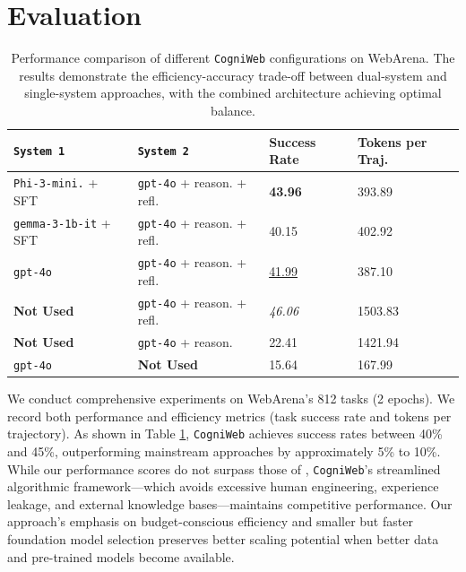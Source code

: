 \documentclass{article}
\begin{document}
\section{Evaluation}
    \begin{table}
    \centering
    \caption{Performance comparison of different \texttt{CogniWeb} configurations on WebArena. The results demonstrate the efficiency-accuracy trade-off between dual-system and single-system approaches, with the combined architecture achieving optimal balance.}\label{results}
    \begin{tabular}{p{}|p{}|p{}p{}}
        \toprule
        \midrule
        \texttt{System 1} & \texttt{System 2} & \textbf{Success Rate} & \textbf{Tokens per Traj.} \\
        \midrule
        \texttt{Phi-3-mini.} + SFT & \texttt{gpt-4o} + reason. + refl. & \textbf{43.96} & 393.89 \\
        \midrule
        \texttt{gemma-3-1b-it} + SFT & \texttt{gpt-4o} + reason. + refl. & 40.15 & 402.92 \\
        \midrule
        \texttt{gpt-4o} & \texttt{gpt-4o} + reason. + refl. & \underline{41.99} & 387.10 \\
        \midrule\midrule
        \textbf{Not Used} & \texttt{gpt-4o} + reason. + refl. & \textit{46.06} & 1503.83 \\
        \midrule
        \textbf{Not Used} & \texttt{gpt-4o} + reason. & 22.41 & 1421.94 \\
        \midrule
        \texttt{gpt-4o} & \textbf{Not Used} & 15.64 & 167.99 \\
        \midrule
        \bottomrule
    \end{tabular}
    \end{table}
We conduct comprehensive experiments on WebArena's 812 tasks (2 epochs). We record both performance and efficiency metrics (task success rate and tokens per trajectory). As shown in Table \ref{results}, \texttt{CogniWeb} achieves success rates between 40\% and 45\%, outperforming mainstream approaches \citet{zhang2025webpilot,sodhi2023step} by approximately 5\% to 10\%. While our performance scores do not surpass those of \citet{zhang2025symbiotic,su2025learn}, \texttt{CogniWeb}'s streamlined algorithmic framework—which avoids excessive human engineering, experience leakage, and external knowledge bases—maintains competitive performance. Our approach's emphasis on budget-conscious efficiency and smaller but faster foundation model selection preserves better scaling potential when better data and pre-trained models become available.
\end{document}
